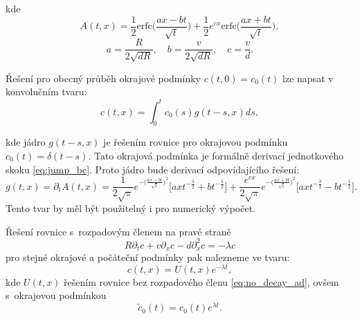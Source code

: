 \documentclass{article}
\def\prtl{\partial}
\begin{document}
kde
\[
    A(t,x) = \frac12 \mathrm{erfc}\Big(\frac{ax-bt}{\sqrt t}\Big)
    + \frac12 e^{cx}\mathrm{erfc}\Big(\frac{ax+bt}{\sqrt t}\Big),
\]
\[
    a = \frac{R}{2\sqrt{dR}},\quad 
    b=\frac{v}{2\sqrt{dR}},\quad 
    c=\frac{v}{d}.
\]

Řešení pro obecný průběh okrajové podmínky $c(t,0) = c_0(t)$ lze napsat v konvolučním tvaru:
\[
    c(t,x) = \int_0^t c_0(s) g(t - s, x) ds,
\]

kde jádro $g(t - s, x)$ je řešením rovnice pro okrajovou podmínku $c_0(t) = \delta(t - s)$. 
Tato okrajová podmínka je formálně derivací jednotkového skoku \eqref{eq:jump_bc}. 
Proto jádro bude derivací odpovídajícího řešení:
\[
    g(t, x) = \prtl_t A(t, x) = 
    \frac{1}{2\sqrt{\pi}} 
    e^{-\big( \frac{ax-bt}{\sqrt{t}}\big)^2}
    \Big[ ax t^{-\frac32} + b t^{-\frac12}\Big]
    + \frac{e^{cx}}{2\sqrt{\pi}}  
    e^{-\big( \frac{ax+bt}{\sqrt{t}}\big)^2}
    \Big[ ax t^{-\frac32} - b t^{-\frac12}\Big].
\]
Tento tvar by měl být použitelný i pro numerický výpočet.


Řešení rovnice s~rozpadovým členem na pravé straně
\[
 R\prtl_t c + v \prtl_x c - d \prtl^2_x c = - \lambda c
\]
pro stejné okrajové a počáteční podmínky pak nalezneme ve tvaru:
\[
    c(t,x) = U(t,x) e^{-\lambda t},
\]
kde $U(t,x)$ řešením rovnice bez rozpadového členu \eqref{eq:no_decay_ad}, ovšem s~okrajovou podmínkou
\[
    \tilde{c}_0(t) = c_0(t) e^{\lambda t}.
\]






\end{document}
